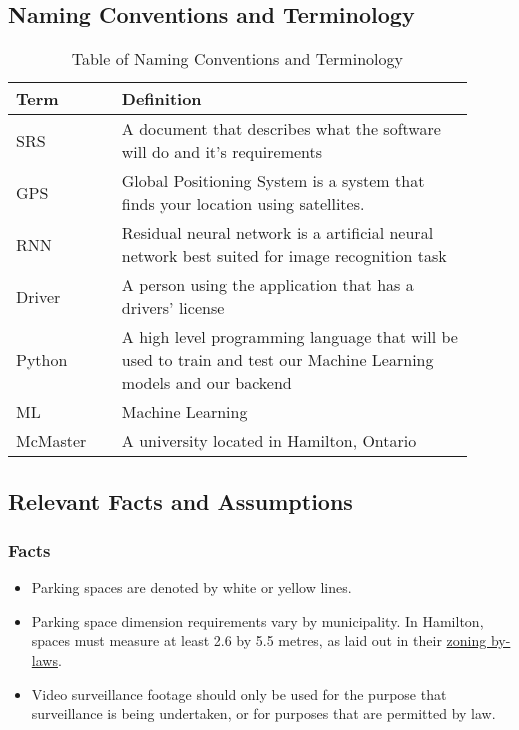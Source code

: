\documentclass[12pt,letterpaper]{article}
\newcommand{\newterm}[1]{\label{Term:#1} \MakeUppercase #1}
\begin{document}
\newpage
\subsection{Naming Conventions and Terminology}
\label{sub:Naming Conventions and Terminology}
\begin{table}[h!]
    \centering
    \caption{Table of Naming Conventions and Terminology}
    \label{tab:Definitions}
    \begin{tabular}{p{0.21\linewidth}  p{0.70\linewidth}}
    \toprule
    \textbf{Term} & \textbf{Definition}\\
    \midrule
    \newterm{SRS} & A document that describes what the software will do and it's
    requirements\\
    \hline
    \newterm{GPS} & Global Positioning System is a system that finds your
    location using satellites.\\
    \hline
    \newterm{RNN} & Residual neural network is a artificial neural network best
    suited for image recognition task \\
    \hline
    \newterm{Driver} & A person using the application that has a drivers'
    license\\
    \hline
    \newterm{Python} & A high level programming language that will be used to
    train and test our Machine Learning models and our backend\\
    \hline
    \newterm{ML} & Machine Learning\\
    \hline
    \newterm{McMaster} & A university located in Hamilton, Ontario\\
    \bottomrule
    \end{tabular}
\end{table}

\subsection{Relevant Facts and Assumptions}
\subsubsection{Facts}
\begin{itemize}
    \item Parking spaces are denoted by white or yellow lines.
    \item Parking space dimension requirements vary by municipality. In
    Hamilton, spaces must measure at least 2.6 by 5.5 metres, as laid out in
    their
    \href{http://www2.hamilton.ca/NR/rdonlyres/D4866111-3F89-42C3-9594-1E7E7F3028AD/0/ZBL05200Section5Parking.pdf}{zoning
    by-laws}.
    \item Video surveillance footage should only be used for the purpose that
    surveillance is being undertaken, or for purposes that are permitted by law.
\end{itemize}
\end{document}
